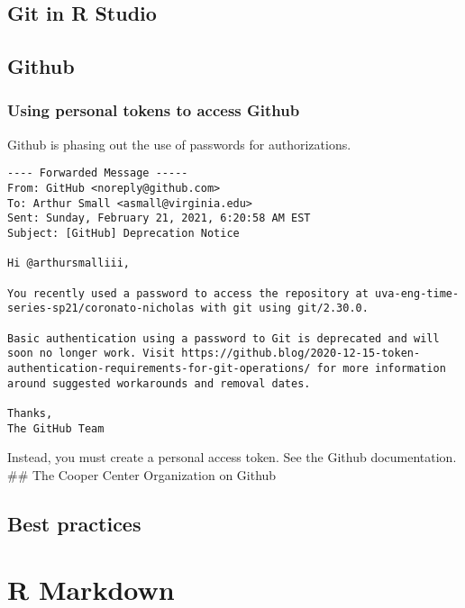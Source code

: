\documentclass[
]{book}
\begin{document}
\hypertarget{git-in-r-studio}{%
\section{Git in R Studio}\label{git-in-r-studio}}

\hypertarget{github}{%
\section{Github}\label{github}}

\hypertarget{using-personal-tokens-to-access-github}{%
\subsection{Using personal tokens to access Github}\label{using-personal-tokens-to-access-github}}

Github is phasing out the use of passwords for authorizations.

\begin{verbatim}
---- Forwarded Message -----
From: GitHub <noreply@github.com>
To: Arthur Small <asmall@virginia.edu>
Sent: Sunday, February 21, 2021, 6:20:58 AM EST
Subject: [GitHub] Deprecation Notice

Hi @arthursmalliii,

You recently used a password to access the repository at uva-eng-time-series-sp21/coronato-nicholas with git using git/2.30.0.

Basic authentication using a password to Git is deprecated and will soon no longer work. Visit https://github.blog/2020-12-15-token-authentication-requirements-for-git-operations/ for more information around suggested workarounds and removal dates.

Thanks,
The GitHub Team
\end{verbatim}

Instead, you must create a personal access token. See the Github documentation.
\#\# The Cooper Center Organization on Github

\hypertarget{best-practices}{%
\section{Best practices}\label{best-practices}}

\hypertarget{r-markdown}{%
\chapter{R Markdown}\label{r-markdown}}
\end{document}
